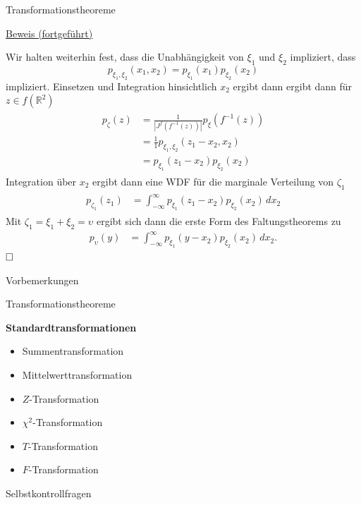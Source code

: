 \documentclass[
  8pt,
  ignorenonframetext,
]{beamer}
\providecommand{\tightlist}{%
  \setlength{\itemsep}{0pt}\setlength{\parskip}{0pt}}
\newcommand{\ups}{\upsilon}
\begin{document}
\begin{frame}{Transformationstheoreme}
\protect\hypertarget{transformationstheoreme-9}{}
\footnotesize

\underline{Beweis (fortgeführt)} \vspace{2mm}

Wir halten weiterhin fest, dass die Unabhängigkeit von \(\xi_1\) und
\(\xi_2\) impliziert, dass \begin{equation}
p_{\xi_1,\xi_2}(x_1,x_2) = p_{\xi_1}(x_1)p_{\xi_2}(x_2)
\end{equation} impliziert. Einsetzen und Integration hinsichtlich
\(x_2\) ergibt dann ergibt dann für \(z \in f(\mathbb{R}^2)\)
\begin{align}
\begin{split}
p_\zeta(z)
& = \frac{1}{|J^f\left(f^{-1}(z)\right)|}p_\xi\left(f^{-1}(z)\right)  \\
& = \frac{1}{1}p_{\xi_1,\xi_2}\left(z_1 - x_2, x_2\right)  \\
& = p_{\xi_1}(z_1 - x_2)p_{\xi_2}(x_2)
\end{split}
\end{align} Integration über \(x_2\) ergibt dann eine WDF für die
marginale Verteilung von \(\zeta_1\) \begin{align}
\begin{split}
p_{\zeta_1}(z_1)
& = \int_{-\infty}^{\infty} p_{\xi_1}(z_1 - x_2)p_{\xi_2}(x_2)\,dx_2
\end{split}
\end{align} Mit \(\zeta_1 = \xi_1 + \xi_2 = \ups\) ergibt sich dann die
erste Form des Faltungstheorems zu \begin{align}
p_\ups(y)
& = \int_{-\infty}^{\infty} p_{\xi_1}(y - x_2)p_{\xi_2}(x_2)\,dx_2.
\end{align} \(\hfill \Box\)
\end{frame}

\begin{frame}{}
\protect\hypertarget{section-5}{}
\large

Vorbemerkungen

Transformationstheoreme

\textbf{Standardtransformationen}

\normalsize

\begin{itemize}
\tightlist
\item
  Summentransformation
\item
  Mittelwerttransformation
\item
  \(Z\)-Transformation
\item
  \(\chi^2\)-Transformation
\item
  \(T\)-Transformation
\item
  \(F\)-Transformation
\end{itemize}

\large

Selbstkontrollfragen
\end{frame}
\end{document}
